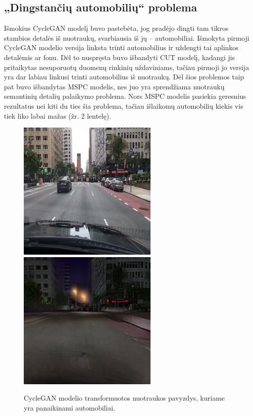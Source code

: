 \documentclass{VUMIFPSbakalaurinis}
\begin{document}
    \subsection{„Dingstančių automobilių“ problema}
        Išmokius CycleGAN modelį buvo pastebėta, jog pradėjo dingti tam tikros stambios detalės iš nuotraukų, svarbiausia iš jų – automobiliai. Išmokyta pirmoji CycleGAN modelio versija linksta trinti automobilius ir uždengti tai aplinkos detalėmis ar fonu. Dėl to nuspręsta buvo išbandyti CUT modelį, kadangi jis pritaikytas nesuporuotų duomenų rinkinių uždaviniams, tačiau pirmoji jo versija yra dar labiau linkusi trinti automobilius iš nuotraukų. Dėl šios problemos taip pat buvo išbandytas MSPC modelis, nes juo yra sprendžiama nuotraukų semantinių detalių palaikymo problema. Nors MSPC modelis pasiekia geresnius rezultatus nei kiti du ties šia problema, tačiau išlaikomų automobilių kiekis vis tiek liko labai mažas (žr. 2 lentelę).
        \begin{figure}[H]
            \centering
            \includegraphics[scale=0.8]{img/CycleGANV1/1_real_B}
            \includegraphics[scale=0.8]{img/CycleGANV1/1_fake_A}
            \captionsetup{width=.8\linewidth}
            \caption{CycleGAN modelio transformuotos nuotraukos pavyzdys, kuriame yra panaikinami automobiliai.}
            \label{img:mlp}
        \end{figure}
\end{document}
